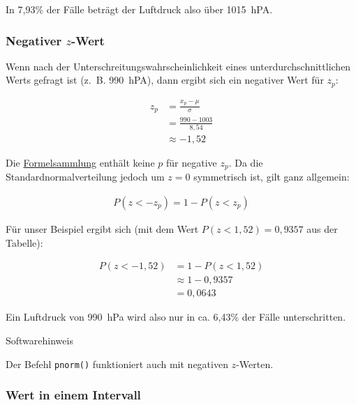 \documentclass[
  11pt,
  ngerman,
  a4paper,
]{report}
\begin{document}
In 7,93\% der Fälle beträgt der Luftdruck also über 1015~hPA.

\hypertarget{negativer-z-wert}{%
\subsubsection{\texorpdfstring{Negativer \(z\)-Wert}{Negativer z-Wert}}\label{negativer-z-wert}}

Wenn nach der Unterschreitungswahrscheinlichkeit eines unterdurchschnittlichen Werts gefragt ist (z.~B. 990~hPA), dann ergibt sich ein negativer Wert für \(z_p\):

\begin{equation}
  \begin{aligned}
    z_p &= \frac{x_p-\mu}{\sigma} \\[4pt]
        &= \frac{990-1003}{8{,}54} \\[4pt]
        &\approx -1{,}52
  \end{aligned}
\end{equation}

Die \href{Formelsammlung\%20und\%20Wertetabellen.pdf}{Formelsammlung} enthält keine \(p\) für negative \(z_p\). Da die Standardnormalverteilung jedoch um \(z=0\) symmetrisch ist, gilt ganz allgemein:

\[
  \begin{aligned}
    P(z < -z_p) = 1 - P(z < z_p)
  \end{aligned}
  \label{eq:neg}
\]

Für unser Beispiel ergibt sich (mit dem Wert \(P(z < 1,52) = 0{,}9357\) aus der Tabelle):

\[
  \begin{aligned}
    P(z < -1,52) &= 1 - P(z < 1,52) \\
    &\approx 1-0{,}9357 \\
    &=0{,}0643
  \end{aligned}
\]

Ein Luftdruck von 990~hPa wird also nur in ca. 6,43\% der Fälle unterschritten.

Softwarehinweis

Der Befehl \texttt{pnorm()} funktioniert auch mit negativen \(z\)-Werten.

\hypertarget{wert-in-einem-intervall}{%
\subsubsection{Wert in einem Intervall}\label{wert-in-einem-intervall}}
\end{document}
